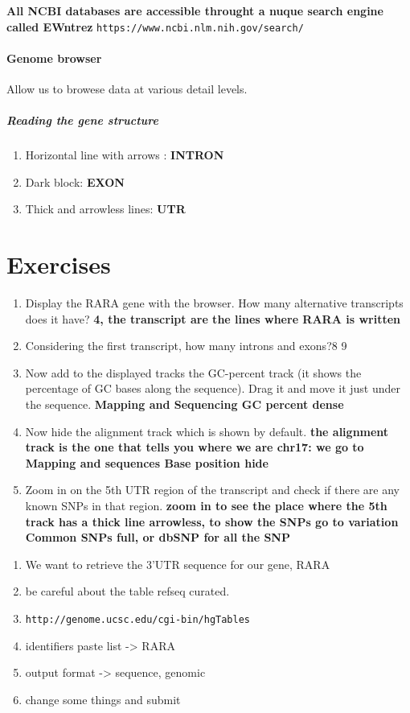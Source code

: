 \documentclass[11pt]{article}
\begin{document}
\textbf{All NCBI databases are accessible throught a nuque search engine called EWntrez} \texttt{https://www.ncbi.nlm.nih.gov/search/}

\paragraph{Genome browser} %
\label{par:genome_browser}
Allow us to browese data at various detail levels.

\subparagraph{Reading the gene structure} %
\label{subp:reading_the_gene_structure}
\begin{enumerate}
	\item Horizontal line with arrows : \textbf{INTRON}
	\item Dark block: \textbf{EXON}	
	\item Thick and arrowless lines: \textbf{UTR}
\end{enumerate}

\section{Exercises} %
\label{sec:exercises}
\begin{enumerate}
	\item Display the RARA gene with the browser. How many alternative transcripts does it have? \textbf{4, the transcript are the lines where RARA is written} 
	\item Considering the first transcript, how many introns and exons?8 9  
	\item Now add to the displayed tracks the GC-percent track (it shows the percentage of GC bases along the sequence). Drag it and move it just under the sequence. \textbf{Mapping and Sequencing GC percent dense}
	\item Now hide the alignment track which is shown by default. \textbf{the alignment track is the one that tells you where we are chr17: we go to Mapping and sequences Base position hide}
	\item Zoom in on the 5th UTR region of the transcript and check if there are any known SNPs in that region. \textbf{zoom in to see the place where the 5th track has a thick line arrowless, to show the SNPs go to variation Common SNPs full, or dbSNP for all the SNP}
\end{enumerate}
\begin{enumerate}
	\item We want to retrieve the 3’UTR sequence for our gene, RARA
	\item be careful about the table refseq curated.
	\item \texttt{http://genome.ucsc.edu/cgi-bin/hgTables}
	\item identifiers paste list -> RARA
	\item output format -> sequence, genomic
	\item change some things and submit
\end{enumerate}
 
\end{document}
